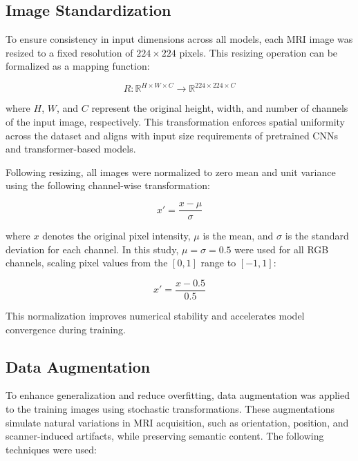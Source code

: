 \documentclass[11pt]{article}
\begin{document}
\subsection*{Image Standardization}

To ensure consistency in input dimensions across all models, each MRI image was resized to a fixed resolution of $224 \times 224$ pixels. This resizing operation can be formalized as a mapping function:

\[
R: \mathbb{R}^{H \times W \times C} \rightarrow \mathbb{R}^{224 \times 224 \times C}
\]

where $H$, $W$, and $C$ represent the original height, width, and number of channels of the input image, respectively. This transformation enforces spatial uniformity across the dataset and aligns with input size requirements of pretrained CNNs and transformer-based models. 

Following resizing, all images were normalized to zero mean and unit variance using the following channel-wise transformation:

\[
x' = \frac{x - \mu}{\sigma}
\]

where $x$ denotes the original pixel intensity, $\mu$ is the mean, and $\sigma$ is the standard deviation for each channel. In this study, $\mu = \sigma = 0.5$ were used for all RGB channels, scaling pixel values from the $[0, 1]$ range to $[-1, 1]$:

\[
x' = \frac{x - 0.5}{0.5}
\]

This normalization improves numerical stability and accelerates model convergence during training.

\subsection*{Data Augmentation}

To enhance generalization and reduce overfitting, data augmentation was applied to the training images using stochastic transformations. These augmentations simulate natural variations in MRI acquisition, such as orientation, position, and scanner-induced artifacts, while preserving semantic content. The following techniques were used:
\end{document}
